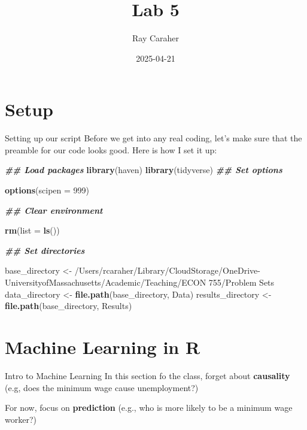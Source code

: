 \documentclass[
  ignorenonframetext,
]{beamer}
\title{Lab 5}
\author{Ray Caraher}
\date{2025-04-21}
\newenvironment{Shaded}{\begin{snugshade}}{\end{snugshade}}
\newcommand{\AttributeTok}[1]{\textcolor[rgb]{0.13,0.29,0.53}{#1}}
\newcommand{\DecValTok}[1]{\textcolor[rgb]{0.00,0.00,0.81}{#1}}
\newcommand{\DocumentationTok}[1]{\textcolor[rgb]{0.56,0.35,0.01}{\textbf{\textit{#1}}}}
\newcommand{\FunctionTok}[1]{\textcolor[rgb]{0.13,0.29,0.53}{\textbf{#1}}}
\newcommand{\NormalTok}[1]{#1}
\newcommand{\OtherTok}[1]{\textcolor[rgb]{0.56,0.35,0.01}{#1}}
\newcommand{\StringTok}[1]{\textcolor[rgb]{0.31,0.60,0.02}{#1}}
\begin{document}
\frame{\titlepage}

\section{Setup}\label{setup}

\begin{frame}[fragile]{Setting up our script}
\label{setting-up-our-script}
Before we get into any real coding, let's make sure that the preamble
for our code looks good. Here is how I set it up:

\tiny

\begin{Shaded}
\begin{Highlighting}[]
\DocumentationTok{\#\# Load packages}
\FunctionTok{library}\NormalTok{(haven)}
\FunctionTok{library}\NormalTok{(tidyverse)}
\DocumentationTok{\#\# Set options}

\FunctionTok{options}\NormalTok{(}\AttributeTok{scipen =} \DecValTok{999}\NormalTok{)}

\DocumentationTok{\#\# Clear environment}

\FunctionTok{rm}\NormalTok{(}\AttributeTok{list =} \FunctionTok{ls}\NormalTok{())}

\DocumentationTok{\#\# Set directories}

\NormalTok{base\_directory }\OtherTok{\textless{}{-}} \StringTok{\textquotesingle{}/Users/rcaraher/Library/CloudStorage/OneDrive{-}UniversityofMassachusetts/Academic/Teaching/ECON 755/Problem Sets\textquotesingle{}}
\NormalTok{data\_directory }\OtherTok{\textless{}{-}} \FunctionTok{file.path}\NormalTok{(base\_directory, }\StringTok{\textquotesingle{}Data\textquotesingle{}}\NormalTok{)}
\NormalTok{results\_directory }\OtherTok{\textless{}{-}} \FunctionTok{file.path}\NormalTok{(base\_directory, }\StringTok{\textquotesingle{}Results\textquotesingle{}}\NormalTok{)}
\end{Highlighting}
\end{Shaded}
\end{frame}

\section{Machine Learning in R}\label{machine-learning-in-r}

\begin{frame}{Intro to Machine Learning}
\label{intro-to-machine-learning}
In this section fo the class, forget about \textbf{causality} (e.g, does
the minimum wage cause unemployment?)

For now, focus on \textbf{prediction} (e.g., who is more likely to be a
minimum wage worker?)
\end{frame}
\end{document}
